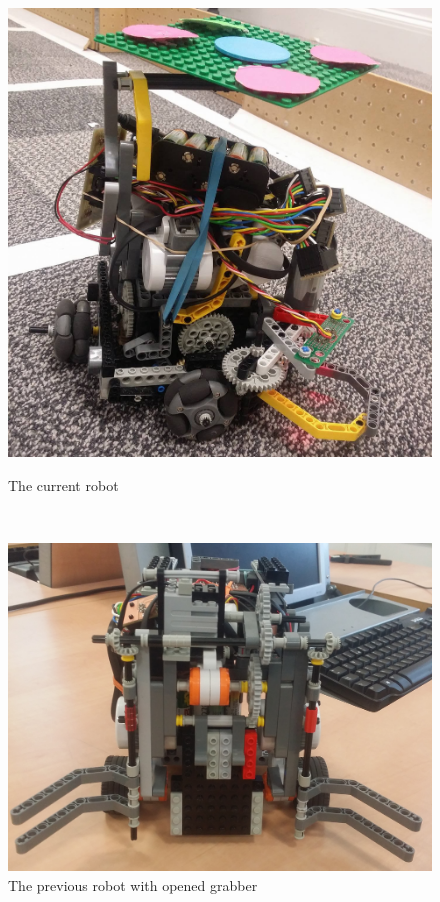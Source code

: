 \documentclass[a4paper,12pt]{article}
\begin{document}
\begin{figure}[ht]
	\begin{minipage}[b]{.405\textwidth}
        \centering
		\includegraphics[scale=0.133]{venus3.jpg}
		\caption{The current robot}
		\label{fig:new}
	\end{minipage}
	~
	\begin{minipage}[b]{.59\textwidth}
        \centering
		\includegraphics[scale=0.0845]{grab_open1.jpg}
		\caption{The previous robot with opened grabber}
		\label{fig:old}
	\end{minipage}
\end{figure}
\end{document}
